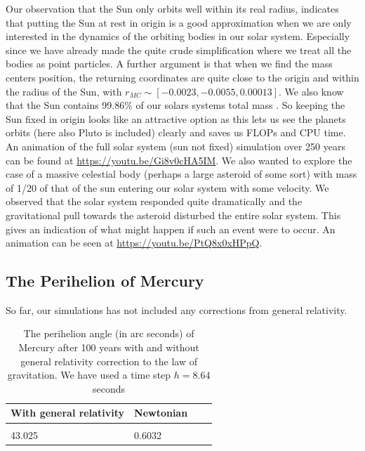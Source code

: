 \documentclass[12pt]{article}
\numberwithin{figure}{section}
\numberwithin{table}{section}
\begin{document}
\noindent Our observation that the Sun only orbits well within its real radius, indicates that putting the Sun at rest in origin is a good approximation when we are only interested in the dynamics of the orbiting bodies in our solar system. Especially since we have already made the quite crude simplification where we treat all the bodies as point particles. A further argument is that when we find the mass centers position, the returning coordinates are quite close to the origin and within the radius of the Sun, with $r_{MC} \sim [ -0.0023, -0.0055, 0.00013]$. We also know that the Sun contains 99.86\% of our solars systems total mass \cite{sun}. So keeping the Sun fixed in origin looks like an attractive option as this lets us see the planets orbits (here also Pluto is included) clearly and saves us FLOPs and CPU time. \\

\noindent An animation of the full solar system (sun not fixed) simulation over 250 years can be found at \url{https://youtu.be/Gi8v0cHA5IM}. We also wanted to explore the case of a massive celestial body (perhaps a large asteroid of some sort) with mass of 1/20 of that of the sun entering our solar system with some velocity. We observed that the solar system responded quite dramatically and the gravitational pull towards the asteroid disturbed the entire solar system. This gives an indication of what might happen if such an event were to occur. An animation can be seen at \url{https://youtu.be/PtQ8x0xHPpQ}.


\subsection{The Perihelion of Mercury}
So far, our simulations has not included any corrections from general relativity.

\begin{table}[ht]
\begin{center}
  \begin{tabular}{| l | l | l | l |}
  \hline
     With general relativity & Newtonian \\[0.05cm]\hline
       & \\
     43.025 & 0.6032 \\
     \hline
  \end{tabular}
\end{center}
\caption{The perihelion angle (in arc seconds) of Mercury after 100 years with and without general relativity correction to the law of gravitation. We have used a time step $h=8.64$ seconds}
\label{tab:perhileon}
\end{table}
\end{document}
